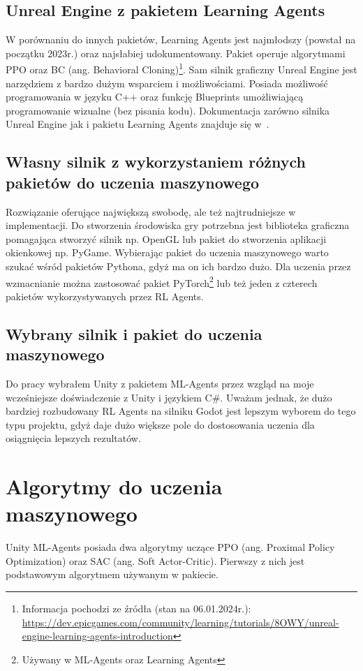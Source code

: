 \documentclass{SGGW-thesis}
\begin{document}
\subsection{Unreal Engine z pakietem Learning Agents}
W porównaniu do innych pakietów, Learning Agents jest najmłodszy (powstał na początku 2023r.) oraz najsłabiej udokumentowany. Pakiet operuje algorytmami PPO oraz BC (ang. Behavioral Cloning)\footnote{Informacja pochodzi ze źródła (stan na 06.01.2024r.): \url{https://dev.epicgames.com/community/learning/tutorials/8OWY/unreal-engine-learning-agents-introduction}}. 
Sam silnik graficzny Unreal Engine jest narzędziem z bardzo dużym wsparciem i możliwościami. Posiada możliwość programowania w języku C++ oraz funkcję Blueprints umożliwiającą programowanie wizualne (bez pisania kodu). 
Dokumentacja zarówno silnika Unreal Engine jak i pakietu Learning Agents znajduje się w~\cite{UnrealDocs}.
\subsection{Własny silnik z wykorzystaniem różnych pakietów do uczenia maszynowego}
Rozwiązanie oferujące największą swobodę, ale też najtrudniejsze w implementacji. Do stworzenia środowiska gry potrzebna jest biblioteka graficzna pomagająca stworzyć silnik np. OpenGL
lub pakiet do stworzenia aplikacji okienkowej np. PyGame. Wybierając pakiet do uczenia maszynowego warto szukać wśród pakietów Pythona, gdyż ma on ich bardzo dużo. Dla uczenia przez wzmacnianie można zastosować pakiet PyTorch\footnote{Używany w ML-Agents oraz Learning Agents}
lub też jeden z czterech pakietów wykorzystywanych przez RL Agents.
\subsection*{Wybrany silnik i pakiet do uczenia maszynowego}
Do pracy wybrałem Unity z pakietem ML-Agents przez wzgląd na moje wcześniejsze doświadczenie z Unity i językiem C\#. Uważam jednak, że dużo bardziej rozbudowany RL Agents na silniku Godot jest lepszym wyborem do tego typu projektu, gdyż daje dużo większe pole do dostosowania uczenia dla osiągnięcia lepszych rezultatów.

\pagebreak
\section{Algorytmy do uczenia maszynowego}
\label{algorithms}
Unity ML-Agents posiada dwa algorytmy uczące PPO (ang. Proximal Policy Optimization) oraz SAC (ang. Soft Actor-Critic). Pierwszy z nich jest podstawowym algorytmem używanym w pakiecie.
\end{document}
